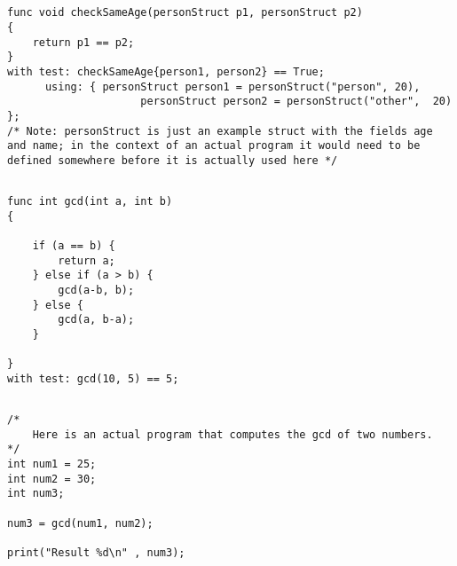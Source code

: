 \documentclass{article}
\begin{document}
\subsection{}
\begin{lstlisting}
func void checkSameAge(personStruct p1, personStruct p2)
{
	return p1 == p2;
}
with test: checkSameAge{person1, person2} == True;
	  using: { personStruct person1 = personStruct("person", 20),
				     personStruct person2 = personStruct("other",  20) };
/* Note: personStruct is just an example struct with the fields age and name; in the context of an actual program it would need to be defined somewhere before it is actually used here */
\end{lstlisting}


\subsection{}
\begin{lstlisting}
func int gcd(int a, int b)
{

	if (a == b) {
		return a;
	} else if (a > b) {
		gcd(a-b, b);
	} else {
		gcd(a, b-a);
	}

}
with test: gcd(10, 5) == 5;
\end{lstlisting}


\subsection{}
\begin{lstlisting}
/*
	Here is an actual program that computes the gcd of two numbers.
*/
int num1 = 25;
int num2 = 30;
int num3;

num3 = gcd(num1, num2);

print("Result %d\n" , num3);
\end{lstlisting}
\end{document}
